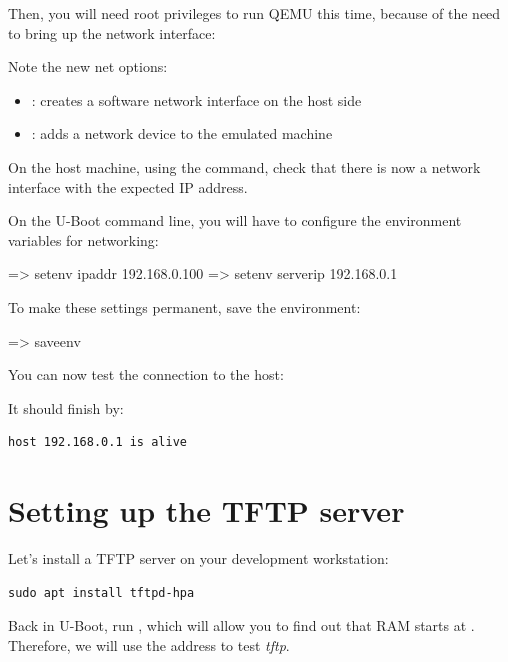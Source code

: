 Then, you will need root privileges to run QEMU this time,
because of the need to bring up the network interface:


Note the new net options:
\begin{itemize}
\item {}: creates a software network interface on the host side
\item \code{-net nic}: adds a network device to the emulated machine
\end{itemize}

On the host machine, using the \code{ip a} command, check that
there is now a  network interface with the expected IP
address.

On the U-Boot command line, you will have to configure the environment
variables for networking:

\begin{ubootinput}
=> setenv ipaddr 192.168.0.100
=> setenv serverip 192.168.0.1
\end{ubootinput}

To make these settings permanent, save the environment:

\begin{ubootinput}
=> saveenv
\end{ubootinput}

You can now test the connection to the host:

It should finish by:
\begin{verbatim}
host 192.168.0.1 is alive
\end{verbatim}

\section{Setting up the TFTP server}

Let's install a TFTP server on your development workstation:

\begin{verbatim}
sudo apt install tftpd-hpa
\end{verbatim}

Back in U-Boot, run , which will allow you to find out that
RAM starts at . Therefore, we will use the 
address to test {\em tftp}.

